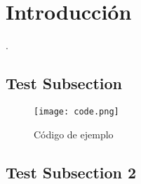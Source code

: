 \section{Introducción}
    \lipsum[1]
    \cite{aorduna2016revolucion}.

    \subsection{Test Subsection}
        \begin{figure}[ht]
            \centering
            \texttt{[image: code.png]}
            \caption{Código de ejemplo}
            \label{fig:code}
        \end{figure}
    
    \subsection{Test Subsection 2}
        \lipsum[1]

    \lipsum[1-2]\cite{jacso2005google}
    
    
\pagebreak
